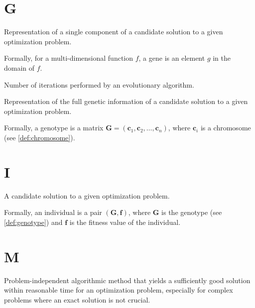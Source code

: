   \section*{G}
    \begin{definition}[Gene]
    \label{def:gene}
      Representation of a single component of a candidate solution to a given optimization problem.

      Formally, for a multi-dimensional function \(f\), a gene is an element \(g\) in the domain of
      \(f\).
    \end{definition}

    \begin{definition}[Generation]
    \label{def:generation}
      Number of iterations performed by an evolutionary algorithm.
    \end{definition}

    \begin{definition}[Genotype]
    \label{def:genotype}
      Representation of the full genetic information of a candidate solution to a given optimization
      problem.

      Formally, a genotype is a matrix \(\mathbf{G} = (\textbf{c}_1, \textbf{c}_2, \dots, 
      \textbf{c}_n)\), where \(\textbf{c}_i\) is a chromosome (see \vref{def:chromosome}).
    \end{definition}

  \section*{I}
    \begin{definition}[Individual]
    \label{def:individual}
      A candidate solution to a given optimization problem.

      Formally, an individual is a pair \((\mathbf{G}, \mathbf{f})\), where \(\mathbf{G}\) is the
      genotype (see \vref{def:genotype}) and \(\mathbf{f}\) is the fitness value of the
      individual.
    \end{definition}

  \section*{M}
    \begin{definition}[Metaheuristics]
    \label{def:metaheuristic}
      Problem-independent algorithmic method that yields a sufficiently good solution within 
      reasonable time for an optimization problem, especially for complex problems where an exact 
      solution is not crucial.
    \end{definition}

